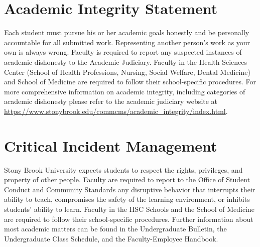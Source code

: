 \documentclass[11pt]{article}
\begin{document}

\section*{Academic Integrity Statement}

Each student must pursue his or her academic goals honestly and be personally accountable for all submitted work. Representing another person's work as your own is always wrong. Faculty is required to report any suspected instances of academic dishonesty to the Academic Judiciary. Faculty in the Health Sciences Center (School of Health Professions, Nursing, Social Welfare, Dental Medicine) and School of Medicine are required to follow their school-specific procedures. For more comprehensive information on academic integrity, including categories of academic dishonesty please refer to the academic judiciary website at\\ \href{https://www.stonybrook.edu/commcms/academic_integrity/index.html}{https://www.stonybrook.edu/commcms/academic\_integrity/index.html}.

\section*{Critical Incident Management}

Stony Brook University expects students to respect the rights, privileges, and property of other people. Faculty are required to report to the Office of Student Conduct and Community Standards any disruptive behavior that interrupts their ability to teach, compromises the safety of the learning environment, or inhibits students' ability to learn. Faculty in the HSC Schools and the School of Medicine are required to follow their school-specific procedures. Further information about most academic matters can be found in the Undergraduate Bulletin, the Undergraduate Class Schedule, and the Faculty-Employee Handbook.
\end{document}

